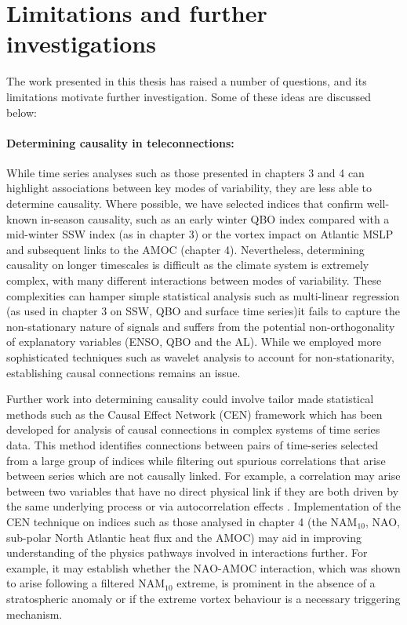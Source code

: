 \section{Limitations and further investigations}
\label{sec:limitations}
The work presented in this thesis has raised a number of questions, and its limitations motivate further investigation. Some of these ideas are discussed below:

\paragraph{Determining causality in teleconnections:}
While time series analyses such as those presented in chapters 3 and 4 can highlight associations between key modes of variability, they are less able to determine causality. Where possible, we have selected indices that confirm well-known in-season causality, such as an early winter QBO index compared with a mid-winter SSW index (as in chapter 3) or the vortex impact on Atlantic MSLP and subsequent links to the AMOC (chapter 4). Nevertheless, determining causality on longer timescales is difficult as the climate system is extremely complex, with many different interactions between modes of variability. These complexities can hamper simple statistical analysis such as multi-linear regression (as used in chapter 3 on SSW, QBO and surface time series)it fails to capture the non-stationary nature of signals and suffers from the potential non-orthogonality of explanatory variables (ENSO, QBO and the AL). While we employed more sophisticated techniques such as wavelet analysis to account for non-stationarity, establishing causal connections remains an issue.

Further work into determining causality could involve tailor made statistical methods such as the Causal Effect Network (CEN) framework \citep{Kretschmer2016} which has been developed for analysis of causal connections in complex systems of time series data. This method identifies connections between pairs of time-series selected from a large group of indices while filtering out spurious correlations that arise between series which are not causally linked. For example, a correlation may arise between two variables that have no direct physical link if they are both driven by the same underlying process or via autocorrelation effects \citep{rungeQuantifying2014}. Implementation of the CEN technique on indices such as those analysed in chapter 4 (the NAM$_{10}$, NAO, sub-polar North Atlantic heat flux and the AMOC) may aid in improving understanding of the physics pathways involved in interactions further. For example, it may establish whether the NAO-AMOC interaction, which was shown to arise following a filtered NAM$_{10}$ extreme, is prominent in the absence of a stratospheric anomaly or if the extreme vortex behaviour is a necessary triggering mechanism. 

